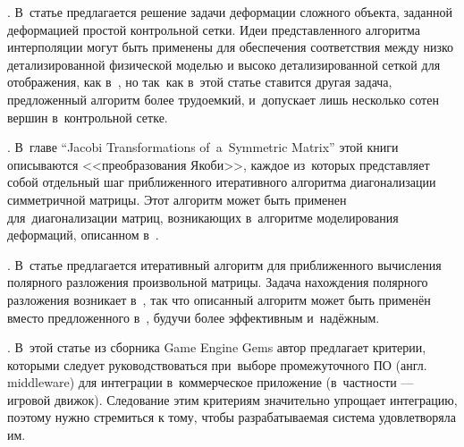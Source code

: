\documentclass[a4paper,11pt]{report}
\begin{document}
    \cite[Efficient Mesh Deformation Using Tetrahedron Control Mesh]{huang-control-mesh}.
      В~статье предлагается решение задачи деформации сложного объекта, заданной деформацией простой
      контрольной сетки. Идеи представленного алгоритма интерполяции могут быть применены для
      обеспечения соответствия между низко детализированной физической моделью и высоко детализированной
      сеткой для отображения, как в~\cite{visser-mapping}, но так~как в~этой статье ставится другая
      задача, предложенный алгоритм более трудоемкий, и~допускает лишь несколько сотен вершин
      в~контрольной сетке.

    \cite[Numerical Recipes...]{fortran-jacobi}. В~главе {\English ``Jacobi Transformations
      of~a~Symmetric Matrix''} этой книги описываются <<преобразования Якоби>>, каждое из~которых
      представляет собой отдельный шаг приближенного итеративного алгоритма диагонализации
      симметричной матрицы. Этот алгоритм может быть применен для~диагонализации матриц, возникающих
      в~алгоритме моделирования деформаций, описанном в~\cite{muller-meshless}.
      
    \cite[Frobenius Iteration for the Matrix Polar Decomposition]{hp-polar}. В~статье
      предлагается итеративный алгоритм для приближенного вычисления полярного разложения
      произвольной матрицы. Задача нахождения полярного разложения возникает в~\cite{muller-meshless},
      так что описанный алгоритм может быть применён вместо предложенного в~\cite{muller-meshless},
      будучи более эффективным и~надёжным.

    \cite[What to Look for When Evaluating Middleware for Integration]{gems-middleware}.
      В~этой статье из сборника {\English Game Engine Gems} автор предлагает критерии, которыми
      следует руководствоваться при~выборе промежуточного ПО (англ. {\English middleware}) для интеграции
      в~коммерческое приложение (в~частности --- игровой движок). Следование этим критериям
      значительно упрощает интеграцию, поэтому нужно стремиться к тому, чтобы разрабатываемая
      система удовлетворяла им.
\end{document}
